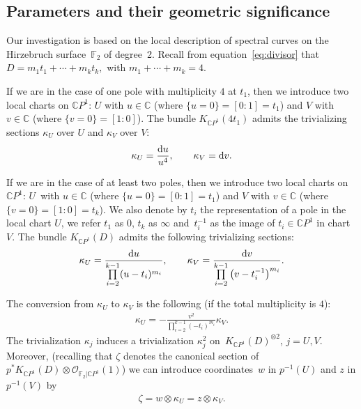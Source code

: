 \documentclass[pdftex]{sigma}
\newcommand{\C}{{\mathbb C}} %
\renewcommand{\O}{{\mathcal O}} %
\newcommand{\CP}[1]{\mathbb{C}P^{#1}} %
\renewcommand{\d}{{\rm d}} %
\numberwithin{equation}{section}
\begin{document}
\subsection{Parameters and their geometric significance}\label{ssec:param_geo}
Our investigation is based on the local description of spectral
curves on the Hirzebruch surface~{${\mathbb {F}}_2$} of degree~2.
Recall from equation~\eqref{eq:divisor} that
$D = m_1 t_1 + \cdots + m_k t_k,$ with $ m_1 + \cdots + m_k = 4$.

If we are in the case of one pole with multiplicity $4$ {at
 $t_1$}, then we introduce two local charts on $\CP{1}$: $U$ with $u\in
\C$ (where $\{u=0\}=[0:1]=t_1$) and $V$ with $v \in \C$ (where $\{
v=0\}=[1:0]$). The bundle $K_{\CP{1}}(4t_1)$ admits the trivializing
sections $\kappa_U$ over $U$ and $\kappa_V$ over $V$:
\begin{align*}
 \kappa_U = \frac{\d u}{u^4}, \qquad 	\kappa_V = \d v.
\end{align*}

If we are in the case of at least two poles, then we introduce
 two local charts on $\CP{1}$: $U$~with $u\in \C$ (where
 $\{u=0\}=[0:1]=t_1$) and $V$ with $v \in \C$ (where $\{
 v=0\}=[1:0]=t_k$). We also denote by $t_i$ the representation
	of a pole in the local chart $U$, we refer $t_1$ as $0$, $t_k$ as
	$\infty$ and~$t_i^{-1}$ as the image of $t_i\in\CP{1}$ in chart $V$.
	The bundle $K_{\CP{1}}(D)$ admits the following
 trivializing sections:
\begin{gather*}
 \kappa_U = \frac{\d u}{\prod\limits_{i=2}^{k-1}(u-t_i)^{m_i}}, \qquad
	\kappa_V = \frac{\d v}{\prod\limits_{i=2}^{k-1}\big(v-t_i^{-1}\big)^{m_i}}.
\end{gather*}

The conversion from $\kappa_U$ to $\kappa_V$ is the following (if the total multiplicity is $4$):
\begin{gather*}
	{\kappa_U=-\frac{v^2}{\prod\limits_{i=2}^{k-1}(-t_i)^{m_i}} \kappa_V.}
\end{gather*}
The trivialization $\kappa_j$ induces a trivialization $\kappa_j^2$ on~$K_{\CP{1}}(D)^{\otimes 2}$, $j=U,V$.
Moreover, (recalling that $\zeta$ denotes the canonical section of $p^* K_{\CP1}(D) \otimes \O_{{\mathbb {F}}_2 | \CP1}(1)$) we can introduce
coordinates~$w$ in $p^{-1}(U)$ and $z$ in $p^{-1}(V)$ by
\begin{gather}	\label{eq:w-coord}
	\zeta=w\otimes \kappa_U=z\otimes \kappa_V.
\end{gather}
\end{document}
